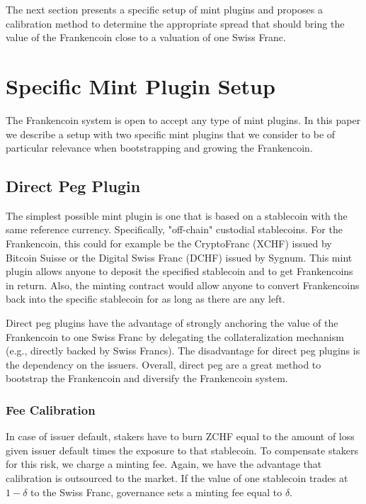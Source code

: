 \documentclass[english,11pt]{article}
\newcommand{\nothing}[1]{}
\begin{document}
The next section presents a specific setup of mint plugins and proposes
a calibration method to determine the appropriate spread that should
bring the value of the Frankencoin close to a valuation of one Swiss Franc. 

\section{Specific Mint Plugin Setup}
The Frankencoin system is open to accept any type of mint plugins. 
In this paper we describe a setup with two specific mint plugins that 
we consider to be of particular relevance when bootstrapping and growing the Frankencoin.

\subsection{Direct Peg Plugin}
The simplest possible mint plugin is one that is based on a stablecoin with the same reference currency. Specifically, "off-chain" custodial stablecoins. For the Frankencoin, this could for example be the CryptoFranc (XCHF) issued by Bitcoin Suisse or the Digital Swiss Franc (DCHF) issued by Sygnum. 
This mint plugin allows anyone to deposit the specified stablecoin and to get Frankencoins in return. Also, the minting contract would allow anyone to convert Frankencoins back into the specific stablecoin for as long as there are any left.

Direct peg plugins have the advantage of strongly anchoring the value of the Frankencoin to one Swiss Franc by delegating the collateralization mechanism
(e.g., directly backed by Swiss Francs).  
The disadvantage for direct peg plugins is the dependency on 
the issuers. Overall, direct peg are a great method to bootstrap 
the Frankencoin and diversify the Frankencoin system.

\subsubsection{Fee Calibration}
In case of issuer default, stakers have to burn ZCHF equal to the amount of
loss given issuer default times the exposure to that stablecoin. 
To compensate stakers for this risk,
we charge a minting fee. Again, we have the advantage that 
calibration is outsourced to the market.
If the value of one stablecoin trades at $1-\delta$ to the Swiss Franc, governance
sets a minting fee equal to $\delta$.

\nothing{
To guard against default risk of an issuer, minting should be limited to the staked amount of Frankencoins in the governance contract. That way, the Frankencoin could absorb a total loss of value of one of the pegged stablecoins. In case of a loss of trust in the pegged stablecoin, it would be challenged in a vote of distrust the remaining coins auctioned off, with the stakers having to take a loss in case the auction does reach a 1:1 conversion rate.
}
\end{document}
